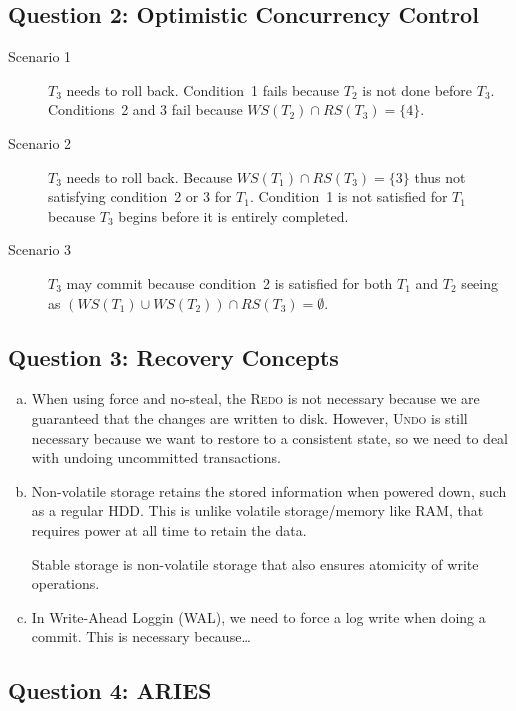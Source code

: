 \documentclass[a4paper]{article}
\begin{document}
\subsection{Question 2: Optimistic Concurrency Control}

\begin{description}
    \item[Scenario 1] $T_3$ needs to roll back. Condition~1 fails because $T_2$
        is not done before $T_3$. Conditions~2 and 3 fail because $WS(T_2) \cap
        RS(T_3) = \{4\}$.
    \item[Scenario 2] $T_3$ needs to roll back. Because $WS(T_1) \cap RS(T_3) =
        \{3\}$ thus not satisfying condition~2 or 3 for $T_1$. Condition~1 is
        not satisfied for $T_1$ because $T_3$ begins before it is entirely
        completed.
    \item[Scenario 3] $T_3$ may commit because condition~2 is satisfied for
        both $T_1$ and $T_2$ seeing as $(WS(T_1) \cup WS(T_2)) \cap RS(T_3) =
        \emptyset$.
\end{description}

\subsection{Question 3: Recovery Concepts}

\begin{enumerate}[(a)]
    \item When using force and no-steal, the \textsc{Redo} is not necessary
        because we are guaranteed that the changes are written to disk.
        However, \textsc{Undo} is still necessary because we want to restore to
        a consistent state, so we need to deal with undoing uncommitted
        transactions.
    \item Non-volatile storage retains the stored information when powered
        down, such as a regular HDD\@. This is unlike volatile storage/memory
        like RAM, that requires power at all time to retain the data.

        Stable storage is non-volatile storage that also ensures atomicity of
        write operations.
    \item In Write-Ahead Loggin (WAL), we need to force a log write when doing
        a commit. This is necessary because\ldots {}
\end{enumerate}

\subsection{Question 4: ARIES}
\end{document}
